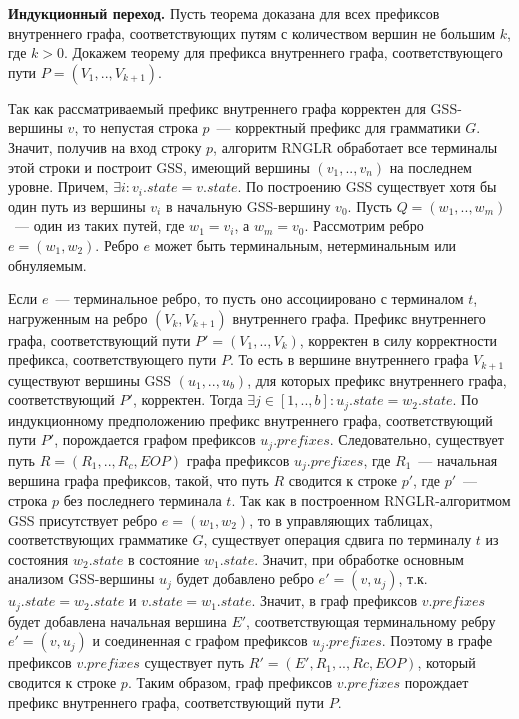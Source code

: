 \textbf{Индукционный переход.} Пусть теорема доказана для всех префиксов внутреннего графа, соответствующих путям с количеством вершин не большим $k$, где $k > 0$. Докажем теорему для префикса внутреннего графа, соответствующего пути $P = (V_{1},..,V_{k+1})$.

Так как рассматриваемый префикс внутреннего графа корректен для GSS-вершины $v$, то непустая строка $p$~--- корректный префикс для грамматики $G$. Значит, получив на вход строку $p$, алгоритм RNGLR обработает все терминалы этой строки и построит GSS, имеющий вершины $(v_{1},..,v_{n})$ на последнем уровне. Причем, $\exists i: v_{i}.state = v.state$. По построению GSS существует хотя бы один путь из вершины $v_{i}$ в начальную GSS-вершину $v_{0}$. Пусть $Q = (w_{1},..,w_{m})$~--- один из таких путей, где $w_{1} = v_{i}$, а $w_{m} = v_{0}$. Рассмотрим ребро $e = (w_{1}, w_{2})$. Ребро $e$ может быть терминальным, нетерминальным или обнуляемым.

Если $e$~--- терминальное ребро, то пусть оно ассоциировано с терминалом $t$, нагруженным на ребро $(V_{k}, V_{k+1})$ внутреннего графа. Префикс внутреннего графа, соответствующий пути $P' = (V_{1},..,V_{k})$, корректен в силу корректности префикса, соответствующего пути $P$. То есть в вершине внутреннего графа $V_{k+1}$ существуют вершины GSS $(u_{1},..,u_{b})$, для которых префикс внутреннего графа, соответствующий $P'$, корректен. Тогда $\exists j \in [1,..,b]: u_{j}.state = w_{2}.state$. По индукционному предположению префикс внутреннего графа, соответствующий пути $P'$, порождается графом префиксов $u_{j}.prefixes$. Следовательно, существует путь $R = (R_{1},..,R_{c}, EOP)$ графа префиксов $u_{j}.prefixes$, где $R_{1}$~--- начальная вершина графа префиксов, такой, что путь $R$ сводится к строке $p'$, где $p'$~--- строка $p$ без последнего терминала $t$. Так как в построенном RNGLR-алгоритмом GSS присутствует ребро $e = (w_{1}, w_{2})$, то в управляющих таблицах, соответствующих грамматике $G$, существует операция сдвига по терминалу $t$ из состояния $w_{2}.state$  в состояние $w_{1}.state$. Значит, при обработке основным анализом GSS-вершины $u_{j}$ будет добавлено ребро $e' = (v, u_{j})$, т.к. $u_{j}.state = w_{2}.state$ и $v.state = w_{1}.state$. Значит, в граф префиксов $v.prefixes$ будет добавлена начальная вершина $E'$, соответствующая терминальному ребру $e' = (v, u_{j})$ и соединенная с графом префиксов $u_{j}.prefixes$. Поэтому в графе префиксов $v.prefixes$ существует путь $R' = (E',R_{1},..,R{c},EOP)$, который сводится к строке $p$. Таким образом, граф префиксов $v.prefixes$ порождает префикс внутреннего графа, соответствующий пути $P$.

